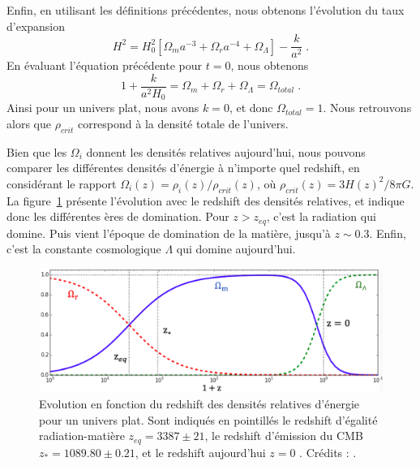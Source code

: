 Enfin, en utilisant les définitions précédentes, nous obtenons l'évolution du taux d'expansion
\begin{equation}
  \label{eq:friedmann7}
  H^2 = H_0^2 \left[\Omega_m a^{-3} + \Omega_r a^{-4} + \Omega_{\Lambda} \right] - \frac{k}{a^{2}}  \; .
\end{equation}
En évaluant l'équation précédente pour $t=0$, nous obtenons
\begin{equation}
  \label{eq:sum_omega}
 1 + \frac{k}{a^{2} H_{0}}  =  \Omega_m + \Omega_r + \Omega_{\Lambda} = \Omega_{total}  \; .
\end{equation}
Ainsi pour un univers plat, nous avons $k = 0$, et donc $\Omega_{total} = 1$. Nous retrouvons alors que $\rho_{crit}$ correspond à la densité totale de l'univers. 

Bien que les $\Omega_i$ donnent les densités relatives aujourd'hui, nous pouvons comparer les différentes densités d'énergie à n'importe quel redshift, en considérant le rapport $\Omega_{i}(z) = \rho_{i}(z) / \rho_{crit}(z)$, où $\rho_{crit}(z) = 3H(z)^{2} / 8 \pi G$. La figure~\ref{fig:evol_omega} présente l'évolution  avec le redshift des densités relatives, et indique donc les différentes ères de domination. Pour $z > z_{eq}$, c'est la radiation qui domine. Puis vient l'époque de domination de la matière, jusqu'à $z \sim \num{0.3}$. Enfin, c'est la constante cosmologique $\Lambda$ qui domine aujourd'hui.
\begin{figure}
  \centering
  \includegraphics[scale=0.4]{evol_omega}
  \caption{Evolution en fonction du redshift des densités relatives d'énergie pour un univers plat. Sont indiqués en pointillés le redshift d'égalité radiation-matière $z_{eq} = 3387 \pm 21$, le redshift d'émission du CMB $z_{\ast} = \num{1089.80} \pm \num{0.21}$, et le redshift aujourd'hui $z = 0$ \autocite{Collaboration2018}. Crédits : \textcite{Zarrouk2018a}.}
\label{fig:evol_omega}
\end{figure}

